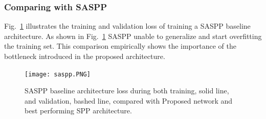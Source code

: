 \subsubsection{Comparing with SASPP}
Fig.~\ref{saspp} illustrates the training and validation loss of training a SASPP baseline architecture. As shown in Fig.~\ref{saspp} SASPP unable to generalize and start overfitting the training set. This comparison empirically shows the importance of the bottleneck introduced in the proposed architecture.

\begin{center}
\begin{figure}[htbp]
\centerline{\texttt{[image: saspp.PNG]}}
\caption{SASPP baseline architecture loss during both training, solid line, and validation, bashed line, compared with Proposed network and best performing SPP architecture.}
\label{saspp}
\end{figure}
\end{center}

